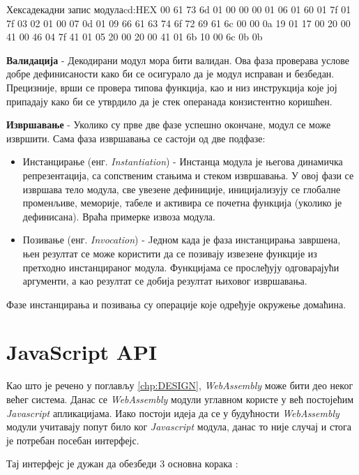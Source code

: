 \documentclass[12pt,oneside]{memoir}
\begin{document}
\begin{code}{Хексадекадни запис модула}{cd:HEX}
00 61 73 6d 01 00 00 00 01 06 01 60 01 7f 01 7f
03 02 01 00 07 0d 01 09 66 61 63 74 6f 72 69 61
6c 00 00 0a 19 01 17 00 20 00 41 00 46 04 7f 41
01 05 20 00 20 00 41 01 6b 10 00 6c 0b 0b
\end{code}

\textbf{Валидација} - Декодирани модул мора бити валидан. Ова фаза проверава услове добре дефинисаности како би се
осигурало да је модул исправан и безбедан. Прецизније, врши се провера типова функција, као и низ инструкција које
јој припадају како би се утврдило да је стек операнада конзистентно коришћен.

\textbf{Извршавање} - Уколико су прве две фазе успешно окончане, модул се може извршити. Сама фаза извршавања се
састоји од две подфазе:

\begin{itemize}
	\item Инстанцирање (енг. \textit{Instantiation}) - Инстанца модула је његова динамичка репрезентација, са
	сопственим стањима и стеком извршавања. У овој	фази се извршава тело модула, све увезене дефиниције,
	иницијализују се глобалне променљиве, меморије, табеле и активира се почетна функција (уколико је дефинисана).
	Враћа примерке извоза модула.
	\item Позивање (енг. \textit{Invocation}) - Jедном када је фаза инстанцирања завршена, њен резултат се може
	користити да се позивају извезене функције из претходно инстанцираног модула. Функцијама се прослеђују
	одговарајући аргументи, а као резултат се добија резултат њиховог извршавања.
\end{itemize}
Фазе инстанцирања и позивања су операције које одређује окружење домаћина.

\section{JavaScript API} \label{chp:JSA}

Као што је речено у поглављу \ref{chp:DESIGN}, \textit{WebAssembly} може бити део неког већег система. Данас се
\textit{WebAssembly} модули углавном користе у већ постојећим \textit{Javascript} апликацијама.
Иако постоји идеја да се у будућности \textit{WebAssembly} модули учитавају попут било ког \textit{Javascript}
модула, данас то није случај и стога је потребан посебан интерфејс.

Тај интерфејс је дужан да обезбеди 3 основна корака \cite{WASMJS}:
\end{document}
